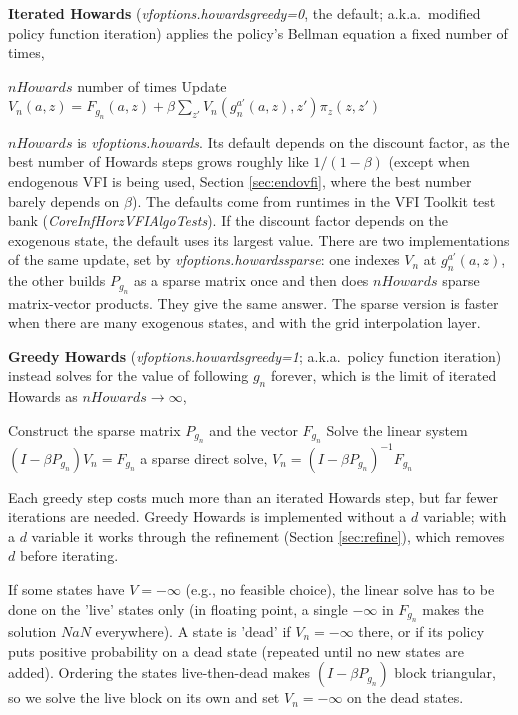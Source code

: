 \textbf{Iterated Howards} (\textit{vfoptions.howardsgreedy=0}, the default; a.k.a.\ modified policy function iteration) applies the policy's Bellman equation a fixed number of times,
\begin{algorithmic}
 \For $nHowards$ number of times
  \State Update $V_n(a,z)=F_{g_n}(a,z)+\beta \sum_{z'} V_n(g^{a'}_n(a,z),z')\pi_z(z,z')$
 \EndFor
\end{algorithmic}
$nHowards$ is \textit{vfoptions.howards}. Its default depends on the discount factor, as the best number of Howards steps grows roughly like $1/(1-\beta)$ (except when endogenous VFI is being used, Section \ref{sec:endovfi}, where the best number barely depends on $\beta$). The defaults come from runtimes in the VFI Toolkit test bank (\textit{CoreInfHorzVFIAlgoTests}). If the discount factor depends on the exogenous state, the default uses its largest value. There are two implementations of the same update, set by \textit{vfoptions.howardssparse}: one indexes $V_n$ at $g^{a'}_n(a,z)$, the other builds $P_{g_n}$ as a sparse matrix once and then does $nHowards$ sparse matrix-vector products. They give the same answer. The sparse version is faster when there are many exogenous states, and with the grid interpolation layer.

\textbf{Greedy Howards} (\textit{vfoptions.howardsgreedy=1}; a.k.a.\ policy function iteration) instead solves for the value of following $g_n$ forever, which is the limit of iterated Howards as $nHowards\to \infty$,
\begin{algorithmic}
 \State Construct the sparse matrix $P_{g_n}$ and the vector $F_{g_n}$
 \State Solve the linear system $(I-\beta P_{g_n})V_n=F_{g_n}$ \Comment a sparse direct solve, $V_n=(I-\beta P_{g_n})^{-1}F_{g_n}$
\end{algorithmic}
Each greedy step costs much more than an iterated Howards step, but far fewer iterations are needed. Greedy Howards is implemented without a $d$ variable; with a $d$ variable it works through the refinement (Section \ref{sec:refine}), which removes $d$ before iterating.

If some states have $V=-\infty$ (e.g., no feasible choice), the linear solve has to be done on the 'live' states only (in floating point, a single $-\infty$ in $F_{g_n}$ makes the solution $NaN$ everywhere). A state is 'dead' if $V_n=-\infty$ there, or if its policy puts positive probability on a dead state (repeated until no new states are added). Ordering the states live-then-dead makes $(I-\beta P_{g_n})$ block triangular, so we solve the live block on its own and set $V_n=-\infty$ on the dead states.

